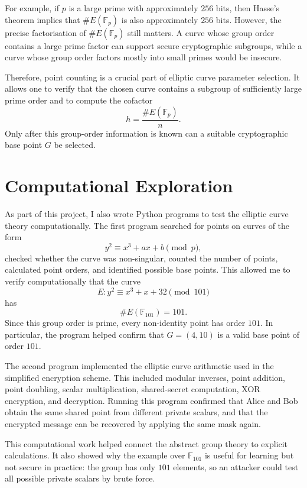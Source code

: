 \documentclass[12pt,a4paper]{article}
\begin{document}
For example, if \(p\) is a large prime with approximately \(256\) bits, then Hasse's theorem implies that \(\#E(\mathbb{F}_p)\) is also approximately \(256\) bits. However, the precise factorisation of \(\#E(\mathbb{F}_p)\) still matters. A curve whose group order contains a large prime factor can support secure cryptographic subgroups, while a curve whose group order factors mostly into small primes would be insecure.

Therefore, point counting is a crucial part of elliptic curve parameter selection. It allows one to verify that the chosen curve contains a subgroup of sufficiently large prime order and to compute the cofactor
\[ h=\frac{\#E(\mathbb{F}_p)}{n}. \]
Only after this group-order information is known can a suitable cryptographic base point \(G\) be selected.

\section{Computational Exploration}

As part of this project, I also wrote Python programs to test the elliptic curve theory computationally. The first program searched for points on curves of the form
\[y^2 \equiv x^3+ax+b \pmod p,\]
checked whether the curve was non-singular, counted the number of points, calculated point orders, and identified possible base points. This allowed me to verify computationally that the curve
\[E:y^2\equiv x^3+x+32\pmod {101}\]
has
\[\#E(\mathbb{F}_{101})=101.\]
Since this group order is prime, every non-identity point has order \(101\). In particular, the program helped confirm that \(G=(4,10)\) is a valid base point of order \(101\).

The second program implemented the elliptic curve arithmetic used in the simplified encryption scheme. This included modular inverses, point addition, point doubling, scalar multiplication, shared-secret computation, XOR encryption, and decryption. Running this program confirmed that Alice and Bob obtain the same shared point from different private scalars, and that the encrypted message can be recovered by applying the same mask again.

This computational work helped connect the abstract group theory to explicit calculations. It also showed why the example over \(\mathbb{F}_{101}\) is useful for learning but not secure in practice: the group has only \(101\) elements, so an attacker could test all possible private scalars by brute force.
\end{document}
